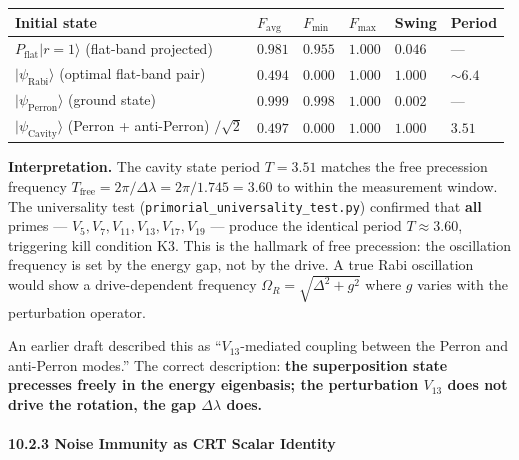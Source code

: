 \documentclass[11pt,letterpaper]{article}
\theoremstyle{definition}
\theoremstyle{remark}
\begin{document}
\begin{longtable}[]{@{}
  >{\raggedright\arraybackslash}p{}
  >{\raggedright\arraybackslash}p{}
  >{\raggedright\arraybackslash}p{}
  >{\raggedright\arraybackslash}p{}
  >{\raggedright\arraybackslash}p{}
  >{\raggedright\arraybackslash}p{}@{}}
\toprule
Initial state & $F_{\text{avg}}$ & $F_{\min}$ & $F_{\max}$ & Swing & Period \\
\midrule
\endhead
\bottomrule
$P_{\text{flat}} \lvert r=1\rangle$ (flat-band projected) & $0.981$ & $0.955$ & $1.000$ & $0.046$ & --- \\
$\lvert\psi_{\text{Rabi}}\rangle$ (optimal flat-band pair) & $0.494$ & $0.000$ & $1.000$ & $1.000$ & $\sim 6.4$ \\
$\lvert\psi_{\text{Perron}}\rangle$ (ground state) & $0.999$ & $0.998$ & $1.000$ & $0.002$ & --- \\
$\lvert\psi_{\text{Cavity}}\rangle$ (Perron + anti-Perron) $/\sqrt{2}$ & $0.497$ & $0.000$ & $1.000$ & $1.000$ & $3.51$ \\
\end{longtable}

\textbf{Interpretation.} The cavity state period $T = 3.51$ matches the free precession frequency $T_{\text{free}} = 2\pi / \Delta\lambda = 2\pi / 1.745 = 3.60$ to within the measurement window. The universality test (\texttt{primorial\_\hspace{0pt}universality\_\hspace{0pt}test.py}) confirmed that \textbf{all} primes --- $V_5, V_7, V_{11}, V_{13}, V_{17}, V_{19}$ --- produce the identical period $T \approx 3.60$, triggering kill condition K3. This is the hallmark of free precession: the oscillation frequency is set by the energy gap, not by the drive. A true Rabi oscillation would show a drive-dependent frequency $\Omega_R = \sqrt{\Delta^2 + g^2}$ where $g$ varies with the perturbation operator.

An earlier draft described this as ``$V_{13}$-mediated coupling between the Perron and anti-Perron modes.'' The correct description: \textbf{the superposition state precesses freely in the energy eigenbasis; the perturbation $V_{13}$ does not drive the rotation, the gap $\Delta\lambda$ does.}

\paragraph{10.2.3 Noise Immunity as CRT Scalar Identity}\label{noise-immunity-as-crt-scalar-identity}
\end{document}
